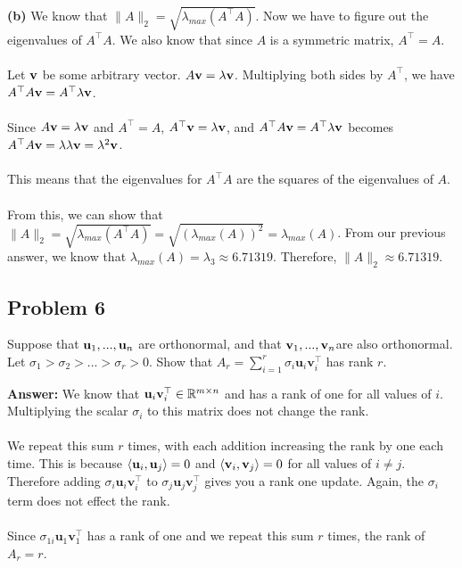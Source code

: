 \documentclass[12pt]{article}
\newcommand{\bfu}{{\bf u}}
\newcommand{\bfv}{{\bf v}}
\begin{document}
\\~\\\textbf{(b)} We know that $\|A\|_2=\sqrt{\lambda_{max}(A^{\top}A)}$. Now we have to figure out the eigenvalues of $A^{\top}A$. We also know that since $A$ is a symmetric matrix, $A^{\top}=A$. 
\\~\\Let $\bfv$ be some arbitrary vector. $A\bfv=\lambda\bfv$. Multiplying both sides by $A^{\top}$, we have $A^{\top}A\bfv=A^{\top}\lambda\bfv$. 
\\~\\Since $A\bfv=\lambda\bfv$ and $A^{\top}=A$, $A^{\top}\bfv=\lambda\bfv$, and $A^{\top}A\bfv=A^{\top}\lambda\bfv$ becomes $A^{\top}A\bfv=\lambda\lambda\bfv=\lambda^2\bfv$. 
\\~\\This means that the eigenvalues for $A^{\top}A$ are the squares of the eigenvalues of $A$. 
\\~\\From this, we can show that $\|A\|_2=\sqrt{\lambda_{max}(A^{\top}A)}=\sqrt{\left(\lambda_{max}(A)\right)^2}=\lambda_{max}(A)$. From our previous answer, we know that $\lambda_{max}(A)=\lambda_3\approx 6.71319$.
Therefore, $\|A\|_2\approx 6.71319$.

\newpage
\subsection*{Problem 6} Suppose that $\bfu_1,...,\bfu_n$ are orthonormal, and that $\bfv_1,...,\bfv_n$are also orthonormal. Let $\sigma_1>\sigma_2>...>\sigma_r>0$. Show that $A_{r}=\sum_{i=1}^{r} \sigma_{i} \mathbf{u}_{i} \mathbf{v}_{i}^{\top}$ has rank $r$.

\bigskip
\noindent\textbf{Answer:} We know that $\bfu_i\bfv_i^{\top}\in\mathbb{R}^{m\times n}$ and has a rank of one for all values of $i$. Multiplying the scalar $\sigma_i$ to this matrix does not change the rank.
\\~\\We repeat this sum $r$ times, with each addition increasing the rank by one each time. This is because $\langle\bfu_i, \bfu_j\rangle=0$ and $\langle\bfv_i, \bfv_j\rangle=0$ for all values of $i\neq j$. Therefore adding $\sigma_{i} \mathbf{u}_{i} \mathbf{v}_{i}^{\top}$ to $\sigma_{j} \mathbf{u}_{j} \mathbf{v}_{j}^{\top}$ gives you a rank one update. Again, the $\sigma_i$ term does not effect the rank.
\\~\\Since $\sigma_{1i} \mathbf{u}_{1} \mathbf{v}_{1}^{\top}$ has a rank of one and we repeat this sum $r$ times, the rank of $A_r=r$.
\end{document}
